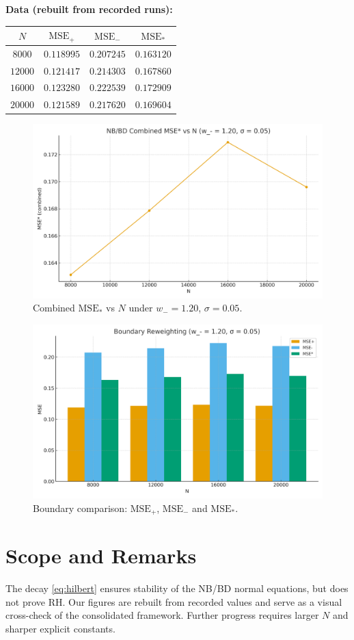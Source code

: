 \documentclass[11pt]{article}
\theoremstyle{remark}
\begin{document}
\noindent\textbf{Data (rebuilt from recorded runs):}
\medskip

\begin{center}
\begin{tabular}{c|c|c|c}
\hline
$N$ & $\mathrm{MSE}_+$ & $\mathrm{MSE}_-$ & $\mathrm{MSE}_\ast$ \\
\hline
$8000$  & $0.118995$ & $0.207245$ & $0.163120$ \\
$12000$ & $0.121417$ & $0.214303$ & $0.167860$ \\
$16000$ & $0.123280$ & $0.222539$ & $0.172909$ \\
$20000$ & $0.121589$ & $0.217620$ & $0.169604$ \\
\hline
\end{tabular}
\end{center}

\begin{figure}[h]
\centering
\includegraphics[width=0.75\linewidth]{figures/figure1_mse_star.png}
\caption{Combined $\mathrm{MSE}_\ast$ vs $N$ under $w_-=1.20$, $\sigma=0.05$.}
\end{figure}

\begin{figure}[h]
\centering
\includegraphics[width=0.75\linewidth]{figures/figure2_boundaries.png}
\caption{Boundary comparison: $\mathrm{MSE}_+$, $\mathrm{MSE}_-$ and $\mathrm{MSE}_\ast$.}
\end{figure}

\section{Scope and Remarks}
The decay \eqref{eq:hilbert} ensures stability of the NB/BD normal equations, but does not prove RH.
Our figures are rebuilt from recorded values and serve as a visual cross-check of the consolidated framework.
Further progress requires larger $N$ and sharper explicit constants.
\end{document}
